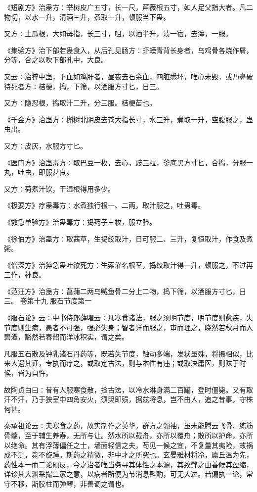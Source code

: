 \documentclass[a4paper,12pt,UTF8,twoside]{ctexbook}
\begin{document}
《短剧方》治蛊方∶举树皮广五寸，长一尺，芦薇根五寸，如人足父指大者。凡二物切，以水一升，清酒三升，煮取一升，顿服当下蛊。

又方∶土瓜根，大如母指，长三寸，咀，以酒半升，渍一宿，去滓，一服。

《集验方》治下部若蛊食入，从后孔见肠方∶虾蟆青背长身者，乌鸡骨各烧作屑，分等，合之以吹下部孔中，大良。

又云∶治猝中蛊，下血如鸡肝者，昼夜去石余血，四脏悉坏，唯心未毁，或乃鼻破待死者方∶桔梗，捣，下筛，以酒服方寸匕，日三。

又方∶隐忍根，捣取汁二升，分三服。桔梗苗也。

《千金方》治蛊方∶槲树北阴皮去苍大指长寸，水三升，煮取一升，空腹服之，蛊虫出。

又方∶皮灰，水服方寸匕。

《医门方》治蛊毒方∶取巴豆一枚，去心，豉三粒，釜底黑方寸匕，合捣，分服一丸，吐虫，即服甚良。

又方∶荷煮汁饮，干湿根得用多少。

《极要方》疗蛊毒方∶水煮独行根一、二两，取汁服之，吐蛊毒。

《救急单验方》治蛊毒方∶捣药子三枚，服立验。

《徐伯方》治蛊方∶取茜草，生捣绞取汁，日可服二、三升，复恒取汁，作食及煮粥。

《僧深方》治猝急蛊吐欲死方∶生索濯名根茎，捣绞取汁得一升，顿服之，不过再三作，神良。

《范汪方》治蛊方∶菖蒲二两乌贼鱼骨二分上二物，捣下筛，以酒服方寸匕，日三。
卷第十九
服石节度第一

《服石论》云∶中书侍郎薛曜云∶凡寒食诸法，服之须明节度，明节度则愈疾，失节度则生病，愚者不可强，强必失身；智者详而服之，审而理之，晓然若秋月而入碧潭，豁然若春韶而洋冰积实，谓之矣。

凡服五石散及钟乳诸石丹药等，既若失节度，触动多端，发状虽殊，将摄相似，比来人遇其证，专执而疗之，或取定古法，则与本性有违；或取决庸医，则昧于时候，皆为自忤。

故陶贞白曰∶昔有人服寒食散，捡古法，以冷水淋身满二百罐，登时僵毙。又有取汗不汗，乃于狭室中四角安火，须臾即殒，据兹将息，岂不由人，追之昔事，守株何甚。

秦承祖论云∶夫寒食之药，故实制作之英华，群方之领袖，虽未能腾云飞骨、练筋骨髓，至于辅生养寿，无所与让。然水所以载舟，亦所以覆舟；散所以护命，亦所以绝命。其有浮薄偏任之士，墙面轻信之夫，苟见一候之宜，不复量其夷险，故祸成不测，毙不旋踵。斯药之精微，非中才之所究也。玄晏雅材将冷，廪丘温为先，药性本一而二论硕反，今之治者唯当务寻其体性之本源，其致弊之由善候其盈缩，详诊其大渊采撮二家之意，以病者所便为节消息斟酌，可无大过。若偏执一论，常守不移，斯胶柱而弹琴，非善调之谓也。
\end{document}
